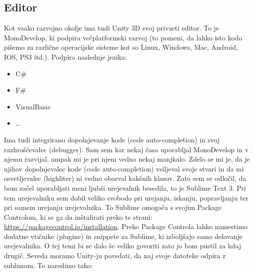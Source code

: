 {\color{indiagreen}\subsection{Editor}}
Kot vsako razvojno okolje ima tudi Unity 3D svoj privzeti editor. To je MonoDevelop, ki podpira večplatformski razvoj (to pomeni, da lahko isto kodo pišemo za različne operacijske sisteme kot so Linux, Windows, Mac, Android, IOS, PS3 itd.). Podpira naslednje jezika: \\
\begin{itemize}
	\item C\# \cite{GameDevThorn}
	\item F\#
	\item VisualBasic
	\item \dots
\end{itemize}
Ima tudi integrirano dopolnjevanje kode (code auto-completion) in svoj razhroščevalec (debugger). Sam sem kar nekaj časa uporabljal MonoDevelop in v njemu razvijal, ampak mi je pri njem vedno nekaj manjkalo. Zdelo se mi je, da je njihov dopolnjevalec kode (code auto-completion) vsiljeval svoje stvari in da mi osvetljevalec (highliter) ni vedno obarval kakšnih klasov. Zato sem se odločil, da bom začel uporabljati meni ljubši urejevalnik besedila, to je Sublime Text 3. Pri tem urejevalniku sem dobil veliko svobodo pri urejanju, iskanju, popravljanju ter pri samem urejanju urejevalnika. To Sublime omogoča s svojim Package Controlom, ki se ga da inštalirati preko te strani: \url{https://packagecontrol.io/installation}. Preko Package Controla lahko namestimo dodatne vtičnike (plugine) in snippete za Sublime, ki izboljšajo samo delovanje urejevalnika. O tej temi bi se dalo še veliko govoriti zato jo bom pustil za kdaj drugič. Seveda moramo Unity-ju povedati, da naj svoje datoteke odpira z sublimom. To naredimo tako:\\
